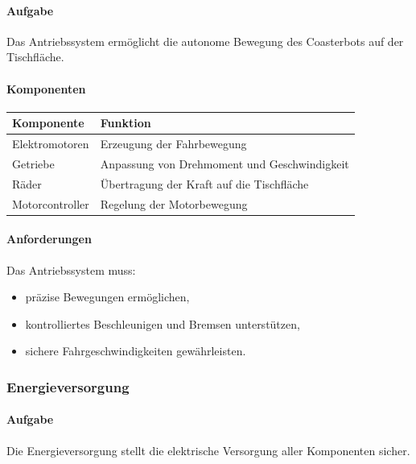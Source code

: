 \paragraph{Aufgabe}\label{aufgabe-1}

Das Antriebssystem ermöglicht die autonome Bewegung des Coasterbots auf
der Tischfläche.

\paragraph{Komponenten}\label{komponenten}

\begin{longtable}[]{@{}ll@{}}
\toprule\noalign{}
Komponente & Funktion \\
\midrule\noalign{}
\endhead
\bottomrule\noalign{}
\endlastfoot
Elektromotoren & Erzeugung der Fahrbewegung \\
Getriebe & Anpassung von Drehmoment und Geschwindigkeit \\
Räder & Übertragung der Kraft auf die Tischfläche \\
Motorcontroller & Regelung der Motorbewegung \\
\end{longtable}

\paragraph{Anforderungen}\label{anforderungen-1}

Das Antriebssystem muss:

\begin{itemize}
\tightlist
\item
  präzise Bewegungen ermöglichen,
\item
  kontrolliertes Beschleunigen und Bremsen unterstützen,
\item
  sichere Fahrgeschwindigkeiten gewährleisten.
\end{itemize}

\subsubsection{Energieversorgung}\label{energieversorgung-1}

\paragraph{Aufgabe}\label{aufgabe-2}

Die Energieversorgung stellt die elektrische Versorgung aller
Komponenten sicher.

